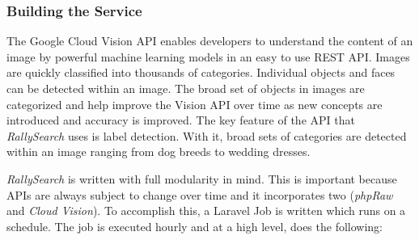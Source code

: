 \documentclass[msc,oneside]{ubcthesis}%
\begin{document}
\subsubsection{Building the Service}
The Google Cloud Vision API enables developers to understand the content of an image by powerful machine learning models in an easy to use REST API. Images are quickly classified into thousands of categories. Individual objects and faces can be detected within an image. The broad set of objects in images are categorized and help improve the Vision API over time as new concepts are introduced and accuracy is improved. The key feature of the API that \textit{RallySearch} uses is label detection. With it, broad sets of categories are detected within an image ranging from dog breeds to wedding dresses.
\par
\textit{RallySearch} is written with full modularity in mind. This is important because APIs are always subject to change over time and it incorporates two (\textit{phpRaw} and \textit{Cloud Vision}). To accomplish this, a Laravel Job is written which runs on a schedule. The job is executed hourly and at a high level, does the following:
\end{document}
